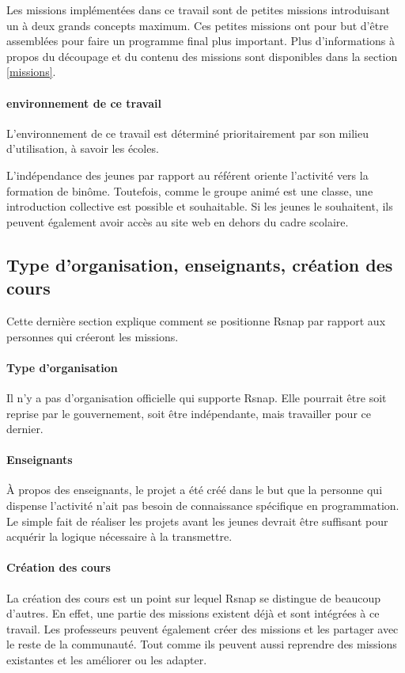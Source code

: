 Les missions implémentées dans ce travail sont de petites missions introduisant un à deux grands concepts maximum. Ces petites missions ont pour but d'être assemblées pour faire un programme final plus important. Plus d'informations à propos du découpage et du contenu des missions sont disponibles dans la section \ref{missions}.

\paragraph{environnement de ce travail}
L'environnement de ce travail est déterminé prioritairement par son milieu d'utilisation, à savoir les écoles. 

L'indépendance des jeunes par rapport au référent oriente l'activité vers la formation de binôme. Toutefois, comme le groupe animé est une classe, une introduction collective est possible et souhaitable. 
Si les jeunes le souhaitent, ils peuvent également avoir accès au site web en dehors du cadre scolaire.

\subsection{Type d'organisation, enseignants, création des cours}
Cette dernière section explique comment se positionne Rsnap par rapport aux personnes qui créeront les missions.

\paragraph{Type d'organisation}
Il n'y a pas d'organisation officielle qui supporte Rsnap. Elle pourrait être soit reprise par le gouvernement, soit être indépendante, mais travailler pour ce dernier.

\paragraph{Enseignants}
À propos des enseignants, le projet a été créé dans le but que la personne qui dispense l'activité n'ait pas besoin de connaissance spécifique en programmation. Le simple fait de réaliser les projets avant les jeunes devrait être suffisant pour acquérir la logique nécessaire à la transmettre.

\paragraph{Création des cours}
La création des cours est un point sur lequel Rsnap se distingue de beaucoup d'autres. En effet, une partie des missions existent déjà et sont intégrées à ce travail. Les professeurs peuvent également créer des missions et les partager avec le reste de la communauté. Tout comme ils peuvent aussi reprendre des missions existantes et les améliorer ou les adapter.

